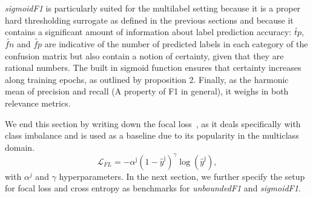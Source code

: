 \emph{sigmoidF1} is particularly suited for the multilabel setting because it is a proper hard thresholding surrogate as defined in the previous sections and because it contains a significant amount of information about label prediction accuracy: $\widetilde{\mathit{tp}}$, $\widetilde{\mathit{fn}}$ and $\widetilde{\mathit{fp}}$ are indicative of the number of predicted labels in each category of the confusion matrix but also contain a notion of certainty, given that they are rational numbers. The built in sigmoid function ensures that certainty increases along training epochs, as outlined by proposition 2. Finally, as the harmonic mean of precision and recall (A property of F1 in general), it weighs in both relevance metrics.

\vspace{\baselineskip}

We end this section by writing down the focal loss~\cite{focalLoss}, as it deals specifically with class imbalance and is used as a baseline due to its popularity in the multiclass domain.
%
\begin{equation}
  \mathcal{L}_{FL} = -\alpha^{\mathrm{j}}\left(1-\hat{y}^{\mathrm{j}}\right)^{\gamma} \log \left(\hat{y}^{\mathrm{j}}\right),
\end{equation}
%
with $\alpha^j$ and $\gamma$ hyperparameters. In the next section, we further specify the setup for focal loss and cross entropy as benchmarks for \emph{unboundedF1} and \emph{sigmoidF1}.










